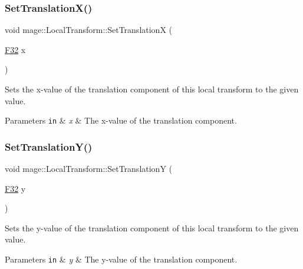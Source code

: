 \subsubsection{\texorpdfstring{Set\+Translation\+X()}{SetTranslationX()}}
{\footnotesize\ttfamily void mage\+::\+Local\+Transform\+::\+Set\+TranslationX (\begin{DoxyParamCaption}\item[{\mbox{\hyperlink{namespacemage_aa97e833b45f06d60a0a9c4fc22ae02c0}{F32}}}]{x }\end{DoxyParamCaption})\hspace{0.3cm}{\ttfamily [noexcept]}}

Sets the x-\/value of the translation component of this local transform to the given value.


\begin{DoxyParams}[1]{Parameters}
\mbox{\tt in}  & {\em x} & The x-\/value of the translation component. \\
\hline
\end{DoxyParams}
\mbox{\label{classmage_1_1_local_transform_a7e06523876b41b3743e54e11516b61b8}} 
\subsubsection{\texorpdfstring{Set\+Translation\+Y()}{SetTranslationY()}}
{\footnotesize\ttfamily void mage\+::\+Local\+Transform\+::\+Set\+TranslationY (\begin{DoxyParamCaption}\item[{\mbox{\hyperlink{namespacemage_aa97e833b45f06d60a0a9c4fc22ae02c0}{F32}}}]{y }\end{DoxyParamCaption})\hspace{0.3cm}{\ttfamily [noexcept]}}

Sets the y-\/value of the translation component of this local transform to the given value.


\begin{DoxyParams}[1]{Parameters}
\mbox{\tt in}  & {\em y} & The y-\/value of the translation component. \\
\hline
\end{DoxyParams}
\mbox{\label{classmage_1_1_local_transform_a11733e0dd9297c3742bc3c50056c71c3}} 
